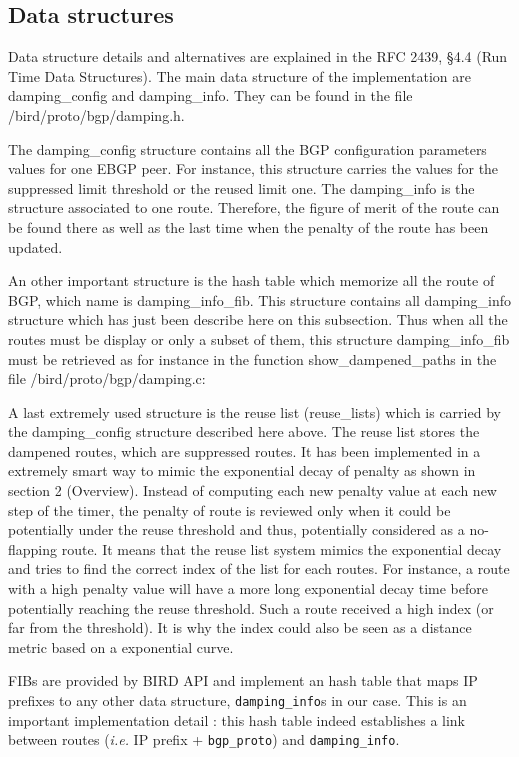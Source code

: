 \documentclass[a4paper,english]{IEEEtran}
\begin{document}
\subsection{Data structures}

Data structure details and alternatives are explained in the RFC 2439,
§4.4 (Run Time Data Structures). The main data structure of the implementation
are damping\_config and damping\_info. They can be found in the file
/bird/proto/bgp/damping.h.

The damping\_config structure contains all the BGP configuration parameters
values for one EBGP peer. For instance, this structure carries the
values for the suppressed limit threshold or the reused limit one.
The damping\_info is the structure associated to one route. Therefore,
the figure of merit of the route can be found there as well as the
last time when the penalty of the route has been updated.

An other important structure is the hash table which memorize all
the route of BGP, which name is damping\_info\_fib. This structure
contains all damping\_info structure which has just been describe
here on this subsection. Thus when all the routes must be display
or only a subset of them, this structure damping\_info\_fib must be
retrieved as for instance in the function show\_dampened\_paths in
the file /bird/proto/bgp/damping.c:

A last extremely used structure is the reuse list (reuse\_lists) which
is carried by the damping\_config structure described here above.
The reuse list stores the dampened routes, which are suppressed routes.
It has been implemented in a extremely smart way to mimic the exponential
decay of penalty as shown in section 2 (Overview). Instead of computing
each new penalty value at each new step of the timer, the penalty
of route is reviewed only when it could be potentially under the reuse
threshold and thus, potentially considered as a no-flapping route.
It means that the reuse list system mimics the exponential decay and
tries to find the correct index of the list for each routes. For instance,
a route with a high penalty value will have a more long exponential
decay time before potentially reaching the reuse threshold. Such a
route received a high index (or far from the threshold). It is why
the index could also be seen as a distance metric based on a exponential
curve.

FIBs are provided by BIRD API and implement an hash table that maps IP prefixes to any other data structure, {\tt\small damping\_info}s in our case.
This is an important implementation detail : this hash table indeed establishes a link between routes (\textit{i.e.} IP prefix + {\tt\small bgp\_proto})
and {\tt\small damping\_info}. 
\end{document}
